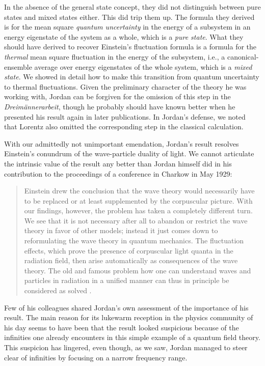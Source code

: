 \documentclass{elsart}
\begin{document}
{In the absence of the general state concept, they did not distinguish between pure states and mixed states either. This did trip them up. The formula they derived is for the mean square {\it quantum uncertainty} in the energy of a subsystem in an energy eigenstate of the system as a whole, which is a {\it pure state}. 
What they should have derived to recover Einstein's fluctuation formula is a formula for the {\it thermal} mean square fluctuation in the energy of the subsystem, i.e., a canonical-ensemble average over energy eigenstates of the whole system, which is a {\it mixed state}. We showed in detail how to make this transition from quantum uncertainty to thermal fluctuations. Given the preliminary character of the theory he was working with, Jordan can be forgiven for the omission of this step in the {\it Dreim\"annerarbeit}, though he probably should have known better when he presented his result again in later publications. In Jordan's defense,  we noted that Lorentz also omitted the corresponding step in the classical calculation.

With our admittedly not unimportant emendation, Jordan's result resolves Einstein's conundrum of the wave-particle duality of light. We cannot articulate the intrinsic value of the result any better than Jordan himself did in his contribution to the proceedings of a conference in Charkow in May 1929:
\begin{quotation}
Einstein drew the conclusion that the wave theory would necessarily have to be replaced or at least supplemented by the corpuscular picture. With our findings, however, the problem has taken a completely different turn. We see that it is not necessary after all to abandon or restrict the wave theory in favor of other models; instead it just comes down to reformulating the wave theory in quantum mechanics. The fluctuation effects, which prove the presence of corpuscular light quanta in the radiation field, then arise automatically as consequences of the wave theory.  The old and famous problem how one can understand waves and particles in radiation in a unified manner can thus in principle be considered as solved \citep[p.\ 702]{Jordan 1929}. 
\end{quotation}
Few of his colleagues shared Jordan's own assessment of the importance of his result. The main reason for its lukewarm reception in the physics community of his day seems to have been that the result looked suspicious because of the infinities one already encounters in this simple example of a quantum field theory. This suspicion has lingered, even though, as we saw, Jordan managed to steer clear of infinities by focusing on a narrow frequency range. 

}
\end{document}
